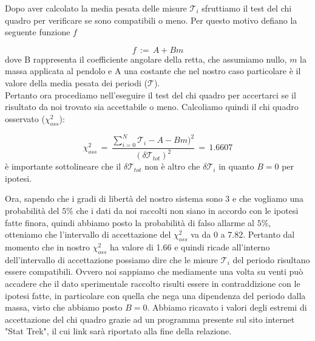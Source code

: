 Dopo aver calcolato la media pesata delle misure $\mathcal{T}_i$ sfruttiamo il test del chi quadro per verificare se sono compatibili o meno. Per questo motivo defiano la seguente funzione $f$

\begin{equation}
	f \,:=\, A + B m 
\end{equation}
%
dove B rappresenta il coefficiente angolare della retta, che assumiamo nullo, $m$ la massa applicata al pendolo e A una costante che nel nostro caso particolare è il valore della media pesata dei periodi ($\mathcal{T}$).\\
Pertanto ora procediamo nell'eseguire il test del chi quadro per accertarci se il risultato da noi trovato sia accettabile o meno. Calcoliamo quindi il chi quadro osservato ($\chi_{oss}^2$):

\begin{equation*}
	\chi_{oss}^2 \,=\, \frac{\sum_{i=0}^{N} \mathcal{T}_i - A - B m)^2}{(\delta \mathcal{T}_{tot})^2} \,=\, 1.6607
\end{equation*}
%
è importante sottolineare che il $\delta \mathcal{T}_{tot}$ non è altro che $\delta \mathcal{T}_i$ in quanto $B = 0$ per ipotesi.

Ora, sapendo che i gradi di libertà del nostro sistema sono 3 e che vogliamo una probabilità del $5\%$ che i dati da noi raccolti non siano in accordo con le ipotesi fatte finora, quindi abbiamo posto la probabilità di falso allarme al $5\%$, otteniamo che l'intervallo di accettazione del $\chi_{oss}^2$ va da 0 a 7.82. Pertanto dal momento che in nostro $\chi_{oss}^2$ ha valore di 1.66 e quindi ricade all'interno dell'intervallo di accettazione possiamo dire che le misure $\mathcal{T}_i$ del periodo risultano essere compatibili. Ovvero noi sappiamo che mediamente una volta su venti può accadere che il dato sperimentale raccolto risulti essere in contraddizione con le ipotesi fatte, in particolare con quella che nega una dipendenza del periodo dalla massa, visto che abbiamo posto $B = 0$.
Abbiamo ricavato i valori degli estremi di accettazione del chi quadro grazie ad un programma presente sul sito internet "Stat Trek", il cui link sarà riportato alla fine della relazione.